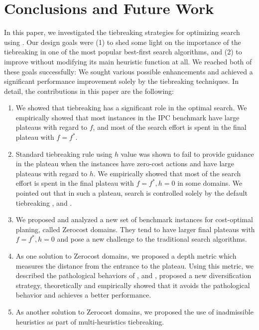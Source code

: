 
\section{Conclusions and Future Work}

In this paper, we investigated the tiebreaking strategies for optimizing search using \astar.  Our design goals
were (1) to shed some light on the importance of the tiebreaking in one of the most popular best-first search
algorithms, and (2) to improve \astar without modifying its main heuristic function at all. We reached both of
these goals successfully: We sought various possible enhancements and achieved a significant performance
improvement solely by the tiebreaking techniques. In detail, the contributions in this paper are the following:

\begin{enumerate}
 \item We showed that tiebreaking has a significant role in the optimal
       search. We empirically showed that most instances in the IPC
       benchmark have large plateaus with regard to $f$, and most of the
       search effort is spent in the final plateau with $f=f^*$.
 \item Standard tiebreaking rule using $h$ value was shown to fail to
       provide guidance in the plateau when the instances have zero-cost
       actions and have large plateaus with regard to $h$.
       We empirically showed that most of the search effort is spent in
       the final plateau with $f=f^*, h=0$ in some domains. We pointed out that in such
       a plateau, search is controlled solely by the
       default tiebreaking \fifo, \lifo and \ro.
 \item We proposed and analyzed a new set of benchmark instances for cost-optimal planing, called Zerocost domains.
       They tend to have larger final plateaus with $f=f^*, h=0$ and pose a new challenge to the traditional search
       algorithms.
 \item As one solution to Zerocost domains, we proposed a depth metric
       which measures the distance from the entrance to the
       plateau. Using this metric, we described the pathological
       behaviors of \fifo, \lifo and \ro, proposed a new diversification
       strategy, theoretically and empirically showed that it avoids the
       pathological behavior and achieves a better performance.
 \item As another solution to Zerocost domains, we proposed the use of
       inadmissible heuristics as part of multi-heuristics tiebreaking.

\end{enumerate}
